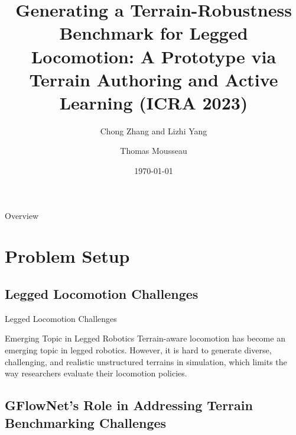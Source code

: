 \documentclass[aspectratio=169,xcolor=dvipsnames]{beamer}
\title{Generating a Terrain-Robustness Benchmark for Legged Locomotion:
A Prototype via Terrain Authoring and Active Learning (ICRA 2023)}
\subtitle{Chong Zhang and Lizhi Yang}
\author{Thomas Mousseau}
\date{\today} %
\begin{document}
\begin{frame}
    \vspace*{-2cm}
    \titlepage
\end{frame}

\begin{frame}{Overview}
    \tableofcontents
\end{frame}

\section{Problem Setup}

\subsection{Legged Locomotion Challenges}

\begin{frame}{Legged Locomotion Challenges}
    \begin{block}{Emerging Topic in Legged Robotics}
        Terrain-aware locomotion has become an emerging topic in legged robotics. However, it is hard to generate diverse, challenging, and realistic unstructured terrains in simulation, which limits the way researchers evaluate their locomotion policies.
    \end{block}

\end{frame}

\subsection{GFlowNet's Role in Addressing Terrain Benchmarking Challenges}
\end{document}
